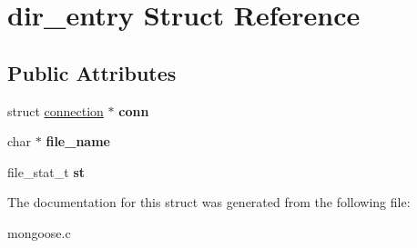 \hypertarget{structdir__entry}{\section{dir\-\_\-entry Struct Reference}
\label{structdir__entry}
}
\subsection*{Public Attributes}
\begin{DoxyCompactItemize}
\item 
\hypertarget{structdir__entry_aa4c9a7128f6c2354020533cb6765dbaa}{struct \hyperlink{structconnection}{connection} $\ast$ {\bfseries conn}}\label{structdir__entry_aa4c9a7128f6c2354020533cb6765dbaa}

\item 
\hypertarget{structdir__entry_a82a02844c430b2e3ca62ebc83059f0f6}{char $\ast$ {\bfseries file\-\_\-name}}\label{structdir__entry_a82a02844c430b2e3ca62ebc83059f0f6}

\item 
\hypertarget{structdir__entry_a535f766ddd8c69623b47b2c2ca2dce96}{file\-\_\-stat\-\_\-t {\bfseries st}}\label{structdir__entry_a535f766ddd8c69623b47b2c2ca2dce96}

\end{DoxyCompactItemize}


The documentation for this struct was generated from the following file\-:\begin{DoxyCompactItemize}
\item 
mongoose.\-c\end{DoxyCompactItemize}
